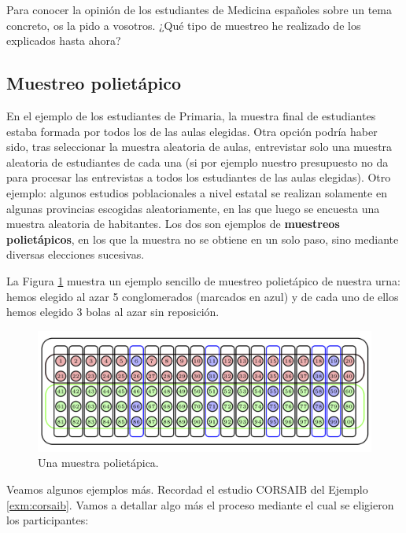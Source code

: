\documentclass[
]{book}
\theoremstyle{definition}
\theoremstyle{definition}
\theoremstyle{definition}
\theoremstyle{definition}
\theoremstyle{remark}
\begin{document}
\begin{rmdexercici}
Para conocer la opinión de los estudiantes de Medicina españoles sobre un tema concreto, os la pido a vosotros. ¿Qué tipo de muestreo he realizado de los explicados hasta ahora?
\end{rmdexercici}

\hypertarget{sec:poli}{%
\subsection{Muestreo polietápico}\label{sec:poli}}

En el ejemplo de los estudiantes de Primaria, la muestra final de estudiantes estaba formada por todos los de las aulas elegidas. Otra opción podría haber sido, tras seleccionar la muestra aleatoria de aulas, entrevistar solo una muestra aleatoria de estudiantes de cada una (si por ejemplo nuestro presupuesto no da para procesar las entrevistas a todos los estudiantes de las aulas elegidas). Otro ejemplo: algunos estudios poblacionales a nivel estatal se realizan solamente en algunas provincias escogidas aleatoriamente, en las que luego se encuesta una muestra aleatoria de habitantes. Los dos son ejemplos de \textbf{muestreos polietápicos}, en los que la muestra no se obtiene en un solo paso, sino mediante diversas elecciones sucesivas.

La Figura \ref{fig:poli} muestra un ejemplo sencillo de muestreo polietápico de nuestra urna: hemos elegido al azar 5 conglomerados (marcados en azul) y de cada uno de ellos hemos elegido 3 bolas al azar sin reposición.

\begin{figure}

{\centering \includegraphics[width=0.8\linewidth]{INREMDN_files/figure-html/poli} 

}

\caption{Una muestra polietápica.}\label{fig:poli}
\end{figure}

Veamos algunos ejemplos más. Recordad el estudio CORSAIB del Ejemplo \ref{exm:corsaib}. Vamos a detallar algo más el proceso mediante el cual se eligieron los participantes:
\end{document}
